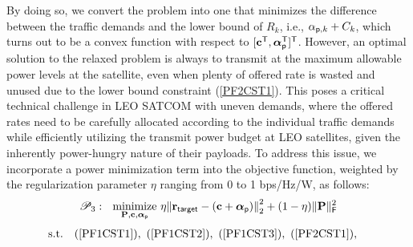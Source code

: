 \documentclass[draftclsnofoot, onecolumn, comsoc, 12pt]{IEEEtran}
\DeclareMathOperator*{\minimize}{minimize}
\begin{document}
By doing so, we convert the problem into one that minimizes the difference between the traffic demands and the lower bound of $R_{k}$, i.e., $\alpha_{{\sf{p}},k} + C_{k}$, which turns out to be a convex function with respect to $[\mathbf{c}^{\sf{T}}, \boldsymbol{\alpha}_{\sf{p}}^{\sf{T}}]^{\sf{T}}$.
However, an optimal solution to the relaxed problem is always to transmit at the maximum allowable power levels at the satellite, even when plenty of offered rate is wasted and unused due to the lower bound constraint (\ref{PF2CST1}).
{ This poses a critical technical challenge in LEO SATCOM with uneven demands, where the offered rates need to be carefully allocated according to the individual traffic demands while efficiently utilizing the transmit power budget at LEO satellites, given the inherently power-hungry nature of their payloads.
To address this issue, we incorporate a power minimization term into the objective function, weighted by the regularization parameter $\eta$ ranging from 0 to 1 bps/Hz/W, as follows:}
\begin{align}
\nonumber
\mathscr{P}_3: \,\,\,\, 
\minimize_{\mathbf{P}, \mathbf{c}, \boldsymbol{\alpha}_{{\sf{p}}}} \,
\eta{\Vert {\mathbf{r}_{\sf target}- (\mathbf{c} + \boldsymbol{\alpha}_{\sf{p}})} \Vert}_{2}^{2} + (1-\eta) \Vert {\mathbf{P}} \Vert_{\sf{F}}^{2}
\end{align}\setcounter{equation}{21}%
\begin{subequations}
\begin{align}
\mathrm{s.t.}\,\,\,\,\,\,
& \textrm{(\ref{PF1CST1})}, \,\, \textrm{(\ref{PF1CST2})}, \,\,  \textrm{(\ref{PF1CST3})}, \,\, \textrm{(\ref{PF2CST1})}, \nonumber
\end{align} 
\end{subequations}
\end{document}
